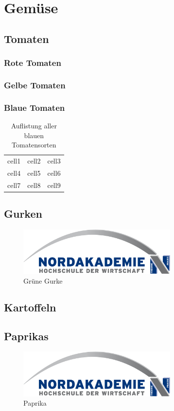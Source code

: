 \section{Gemüse}
\label{sec:Gemuese}

\blindtext

\subsection{Tomaten}
\blindtext

\subsubsection{Rote Tomaten}
\blindtext

\subsubsection{Gelbe Tomaten}
\blindtext

\subsubsection{Blaue Tomaten}
\blindtext

\begin{table}[ht]
    \begin{tabular}{ c c c }
        cell1 & cell2 & cell3 \\ 
        cell4 & cell5 & cell6 \\  
        cell7 & cell8 & cell9 \\
    \end{tabular}
    \caption{Auflistung aller blauen Tomatensorten}
\end{table}

\subsection{Gurken}
\blindtext

\begin{figure}[ht]
    \includegraphics[width=8cm]{dokumente/bilder/Nordakademie_Logo_gross.jpg}
    \centering
    \caption{Grüne Gurke}
\end{figure}

\subsection{Kartoffeln}
\blindtext

\subsection{Paprikas}

\begin{figure}[ht]
    \includegraphics[width=8cm]{dokumente/bilder/Nordakademie_Logo_gross.jpg}
    \centering
    \caption{Paprika}
\end{figure}

\blindtext
